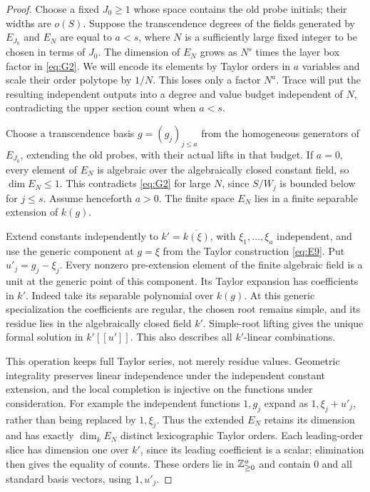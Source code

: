 \begin{proof}
Choose a fixed \(J_0\ge1\) whose space contains the old
probe initials; their widths are \(o(S)\).
Suppose the transcendence degrees of the fields generated
by \(E_{J_0}\) and \(E_N\) are equal to \(a<s\), where \(N\)
is a sufficiently large fixed integer to be chosen in terms
of \(J_0\).  The dimension of \(E_N\) grows as \(N^s\) times
the layer box factor in \eqref{eq:G2}.  We will encode its elements
by Taylor orders in \(a\) variables and scale their order polytope
by \(1/N\).  This loses only a factor \(N^a\).  Trace will put
the resulting independent outputs into a degree and value budget
independent of \(N\), contradicting the upper section count when
\(a<s\).

Choose a transcendence basis \(g=(g_j)_{j\le a}\)
from the homogeneous generators of \(E_{J_0}\), extending
the old probes, with their actual lifts in that budget.
If \(a=0\), every element of \(E_N\) is algebraic over the
algebraically closed constant field, so \(\dim E_N\le1\).
This contradicts \eqref{eq:G2} for large \(N\), since
\(S/W_j\) is bounded below for \(j\le s\).
Assume henceforth \(a>0\).
The finite space \(E_N\) lies in a finite separable extension
of \(k(g)\).

Extend constants independently to \(k'=\overline{k(\xi)}\),
with \(\xi_1,\ldots,\xi_a\) independent, and use the generic
component at \(g=\xi\) from the Taylor construction
\eqref{eq:E9}.  Put \(u'_j=g_j-\xi_j\).
Every nonzero pre-extension element of the finite algebraic
field is a unit at the generic point of this component.
Its Taylor expansion has coefficients in \(k'\).
Indeed take its separable polynomial over \(k(g)\).
At this generic specialization the coefficients are regular,
the chosen root remains simple, and its residue lies in
the algebraically closed field \(k'\).  Simple-root lifting
gives the unique formal solution in \(k'[[u']]\).
This also describes all \(k'\)-linear combinations.

This operation keeps full Taylor series, not merely residue
values.  Geometric integrality preserves linear independence
under the independent constant extension, and the local
completion is injective on the functions under consideration.
For example the independent functions \(1,g_j\) expand as
\(1,\xi_j+u'_j\), rather than being replaced by \(1,\xi_j\).
Thus the extended \(E_N\) retains its dimension and has
exactly \(\dim_k E_N\) distinct lexicographic Taylor orders.
Each leading-order slice has dimension one over \(k'\),
since its leading coefficient is a scalar; elimination then
gives the equality of counts.  These orders lie in
\(\mathbb Z_{\ge0}^a\) and contain \(0\) and all standard basis
vectors, using \(1,u'_j\).


\end{proof}
